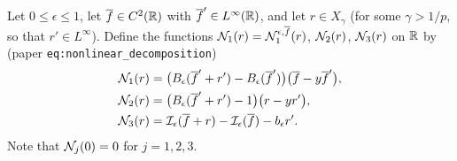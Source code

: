 \begin{definition}
  \label{def:c10_N_pieces}
  Let $0\le\epsilon\le1$, let $\overline{f}\in C^2(\mathbb{R})$ with $\overline{f}'\in L^\infty(\mathbb{R})$, and let
  $r\in X_\gamma$ (for some $\gamma>1/p$, so that $r'\in L^\infty$). Define the functions
  $\mathcal{N}_1(r)=\mathcal{N}_1^{\epsilon,\overline{f}}(r)$, $\mathcal{N}_2(r)$, $\mathcal{N}_3(r)$ on $\mathbb{R}$ by
  (paper \texttt{eq:nonlinear\_decomposition})
  \begin{align*}
    \mathcal{N}_1(r) &= \bigl(B_\epsilon(\overline{f}'+r')-B_\epsilon(\overline{f}')\bigr)\bigl(\overline{f}-y\overline{f}'\bigr),\\
    \mathcal{N}_2(r) &= \bigl(B_\epsilon(\overline{f}'+r')-1\bigr)\bigl(r-yr'\bigr),\\
    \mathcal{N}_3(r) &= \mathcal{I}_\epsilon(\overline{f}+r)-\mathcal{I}_\epsilon(\overline{f})-b_\epsilon r'.
  \end{align*}
  Note that $\mathcal{N}_j(0)=0$ for $j=1,2,3$.
\end{definition}

